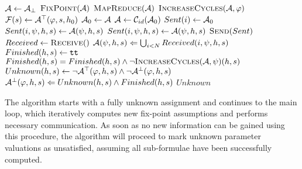 \begin{algorithmic}
	\label{alg:main}
		\State $\mathcal{A} \gets \mathcal{A}_\bot$
		\Repeat
			\Repeat
				\State $\mathcal{\Call{FixPoint}{\assume}}$
				\State $\Call{MapReduce}{\assume}$
			\State $\Call{IncreaseCycles}{\assume, \varphi}$
		\State $\mathcal{F}(s) \gets \mathcal{A}^\top(\varphi, s, h_0)$
	\EndFunction
		\Repeat
			\State $\mathcal{A}_0 \gets \mathcal{A}$
			\State $\mathcal{A} \gets \mathcal{C}_{id}(\mathcal{A}_0)$
	\EndFunction
		\State $Sent(i) \gets \mathcal{A}_0$
				\State $Sent(i, \psi, h, s) \gets \mathcal{A}(\psi, h, s)$
			\EndFor
				\State $Sent(i, \psi, h, s) \gets \mathcal{A}(\psi, h, s)$
			\EndFor
		\EndFor
		\State $\Call{Send}{Sent}$
		\State $Received \gets \Call{Receive}$
		\State $\mathcal{A}(\psi, h, s) \Leftarrow \bigcup_{i < N} Received(i, \psi, h, s)$
	\EndFunction
		\State $Finished(h, s) \gets \texttt{tt} $
			\State $Finished(h, s) = Finished(h, s) \land \neg \Call{IncreaseCycles}{\mathcal{A}, \psi}(h, s)$
		\EndFor
		\State $Unknown(h, s) \gets \neg \mathcal{A}^\top(\varphi, h, s) \land \neg \mathcal{A}^\bot(\varphi, h, s)$		
		\State $\mathcal{A}^\bot(\varphi, h, s) \Leftarrow Unknown(h, s) \land Finished(h,s)$
		\State \Return $Unknown$
	\EndFunction	
\end{algorithmic}

The algorithm starts with a fully unknown assignment and continues to the main loop, which iteratively computes new fix-point assumptions and performs necessary communication. As soon as no new information can be gained using this procedure, the algorithm will proceed to mark unknown parameter valuations as unsatisfied, assuming all sub-formulae have been successfully computed.